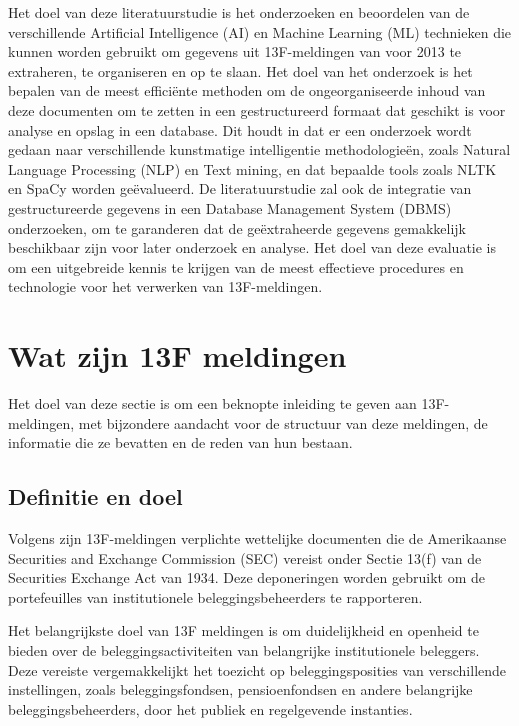Het doel van deze literatuurstudie is het onderzoeken en beoordelen van de verschillende Artificial Intelligence (AI) en Machine Learning (ML) technieken die kunnen worden gebruikt om gegevens uit 13F-meldingen van voor 2013 te extraheren, te organiseren en op te slaan. Het doel van het onderzoek is het bepalen van de meest efficiënte methoden om de ongeorganiseerde inhoud van deze documenten om te zetten in een gestructureerd formaat dat geschikt is voor analyse en opslag in een database. Dit houdt in dat er een onderzoek wordt gedaan naar verschillende kunstmatige intelligentie methodologieën, zoals Natural Language Processing (NLP) en Text mining, en dat bepaalde tools zoals NLTK en SpaCy worden geëvalueerd. De literatuurstudie zal ook de integratie van gestructureerde gegevens in een Database Management System (DBMS) onderzoeken, om te garanderen dat de geëxtraheerde gegevens gemakkelijk beschikbaar zijn voor later onderzoek en analyse. Het doel van deze evaluatie is om een uitgebreide kennis te krijgen van de meest effectieve procedures en technologie voor het verwerken van 13F-meldingen. 

\section{Wat zijn 13F meldingen}

Het doel van deze sectie is om een beknopte inleiding te geven aan 13F-meldingen, met bijzondere aandacht voor de structuur van deze meldingen, de informatie die ze bevatten en de reden van hun bestaan.


\subsection{Definitie en doel}
Volgens \autocite{SECform13F2024} zijn 13F-meldingen verplichte wettelijke documenten die de Amerikaanse Securities and Exchange Commission (SEC) vereist onder Sectie 13(f) van de Securities Exchange Act van 1934. Deze deponeringen worden gebruikt om de portefeuilles van institutionele beleggingsbeheerders te rapporteren.

Het belangrijkste doel van 13F meldingen is om duidelijkheid en openheid te bieden over de beleggingsactiviteiten van belangrijke institutionele beleggers. Deze vereiste vergemakkelijkt het toezicht op beleggingsposities van verschillende instellingen, zoals beleggingsfondsen, pensioenfondsen en andere belangrijke beleggingsbeheerders, door het publiek en regelgevende instanties.

